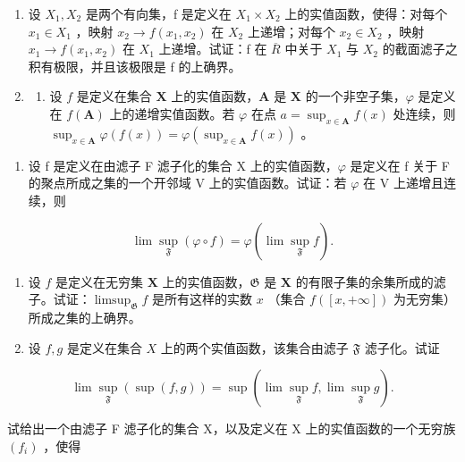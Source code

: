 \BourbakiExerciseGroup

\begin{enumerate}
\def\labelenumi{\arabic{enumi})}
\item
设 \(X_{1}, X_{2}\) 是两个有向集，f 是定义在 \(X_{1} \times X_{2}\) 上的实值函数，使得：对每个 \(x_{1} \in X_{1}\) ，映射 \(x_{2} \to f(x_{1}, x_{2})\) 在 \(X_{2}\) 上递增；对每个 \(x_{2} \in X_{2}\) ，映射 \(x_{1} \rightarrow f(x_{1}, x_{2})\) 在 \(X_{1}\) 上递增。试证：f 在 \(\overline{R}\) 中关于 \(X_{1}\) 与 \(X_{2}\) 的截面滤子之积有极限，并且该极限是 f 的上确界。
\item
  \begin{enumerate}
  \def\labelenumii{\alph{enumii})}
  \tightlist
  \item
设 \(f\) 是定义在集合 \(\mathbf{X}\) 上的实值函数，\(\mathbf{A}\) 是 \(\mathbf{X}\) 的一个非空子集，\(\varphi\) 是定义在 \(f(\mathbf{A})\) 上的递增实值函数。若 \(\varphi\) 在点 \(a = \sup_{x \in \mathbf{A}} f(x)\) 处连续，则 \(\sup_{x \in \mathbf{A}} \varphi(f(x)) = \varphi(\sup_{x \in \mathbf{A}} f(x))\) 。
  \end{enumerate}
\end{enumerate}

\begin{enumerate}
\def\labelenumi{\alph{enumi})}
\setcounter{enumi}{1}
\tightlist
\item
设 f 是定义在由滤子 F 滤子化的集合 X 上的实值函数，\(\varphi\) 是定义在 f 关于 F 的聚点所成之集的一个开邻域 V 上的实值函数。试证：若 \(\varphi\) 在 V 上递增且连续，则
\end{enumerate}

\[
\lim \sup _ {\mathfrak {F}} (\varphi \circ f) = \varphi (\lim \sup _ {\mathfrak {F}} f).
\]

\begin{enumerate}
\def\labelenumi{\arabic{enumi})}
\setcounter{enumi}{2}
\item
设 \(f\) 是定义在无穷集 \(\mathbf{X}\) 上的实值函数，\(\mathfrak{G}\) 是 \(\mathbf{X}\) 的有限子集的余集所成的滤子。试证：\(\limsup_{\mathfrak{G}} f\) 是所有这样的实数 \(x\) （集合 \(f([x, +\infty])\) 为无穷集）所成之集的上确界。
\item
设 \(f, g\) 是定义在集合 \(X\) 上的两个实值函数，该集合由滤子 \(\mathfrak{F}\) 滤子化。试证
\end{enumerate}

\[
\lim \sup _ {\mathfrak {F}} (\sup (f, g)) = \sup (\lim \sup _ {\mathfrak {F}} f, \lim \sup _ {\mathfrak {F}} g).
\]

试给出一个由滤子 F 滤子化的集合 X，以及定义在 X 上的实值函数的一个无穷族 \((f_{i})\) ，使得

